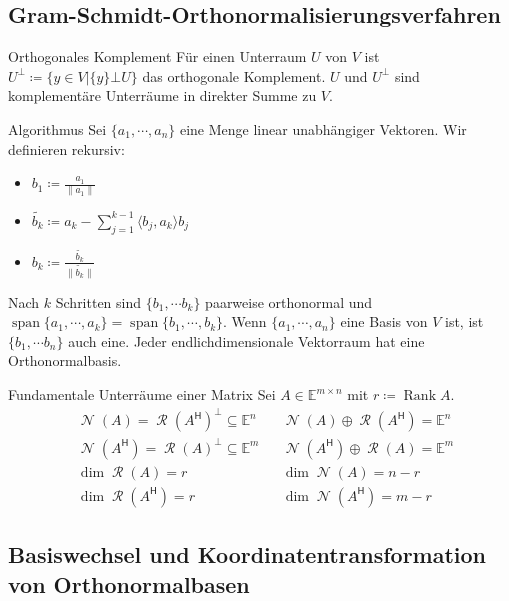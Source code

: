 \documentclass[a4paper,10pt]{article}
\DeclareMathOperator{\Rank}{Rank}
\DeclareMathOperator{\Columnspace}{\mathcal{R}}
\DeclareMathOperator{\Nullspace}{\mathcal{N}}
\DeclareMathOperator{\Span}{span}
\newcommand*{\hermconj}{\mathsf{H}}
\def\E{\mathbb{E}}
\begin{document}
\subsection{Gram-Schmidt-Orthonormalisierungsverfahren}

\begin{subbox}{Orthogonales Komplement}
  Für einen Unterraum $U$ von $V$ ist $U^\bot \coloneqq \{ y \in V | \{y\} \bot U \}$ das orthogonale Komplement. $U$ und $U^\bot$ sind komplementäre Unterräume in direkter Summe zu $V$.
\end{subbox}

\begin{mainbox}{Algorithmus}
  Sei $\{a_1, \cdots, a_n\}$ eine Menge linear unabhängiger Vektoren. Wir definieren rekursiv:
  \begin{itemize}
    \item $b_1 \coloneqq \frac{a_1}{\lVert a_1 \rVert}$
    \item $\widetilde{b_k} \coloneqq a_k - \sum_{j=1}^{k-1} \langle b_j, a_k \rangle b_j$
    \item $b_k \coloneqq \frac{\widetilde{b_k}}{\lVert \widetilde{b_k} \rVert}$
  \end{itemize}

  Nach $k$ Schritten sind $\{b_1, \cdots b_k\}$ paarweise orthonormal und $\Span \{a_1, \cdots, a_k\} = \Span \{b_1, \cdots, b_k\}$. Wenn $\{a_1, \cdots, a_n\}$ eine Basis von $V$ ist, ist $\{b_1, \cdots b_n\}$ auch eine. Jeder endlichdimensionale Vektorraum hat eine Orthonormalbasis.
\end{mainbox}

\begin{mainbox}{Fundamentale Unterräume einer Matrix}
  Sei $A \in \E^{m \times n}$ mit $r \coloneqq \Rank A$.
  \begin{align*}
    & \Nullspace(A) = \Columnspace(A^\hermconj)^\perp \subseteq \E^n & & \Nullspace(A) \oplus \Columnspace(A^\hermconj) = \E^n\\
    & \Nullspace(A^\hermconj) = \Columnspace(A)^\perp \subseteq \E^m & & \Nullspace(A^\hermconj) \oplus \Columnspace(A) = \E^m\\
    & \dim \Columnspace(A) = r & & \dim \Nullspace(A) = n - r\\
    & \dim \Columnspace(A^\hermconj) = r & & \dim \Nullspace(A^\hermconj) = m - r
  \end{align*}
\end{mainbox}

\subsection{Basiswechsel und Koordinatentransformation von Orthonormalbasen}
\end{document}
